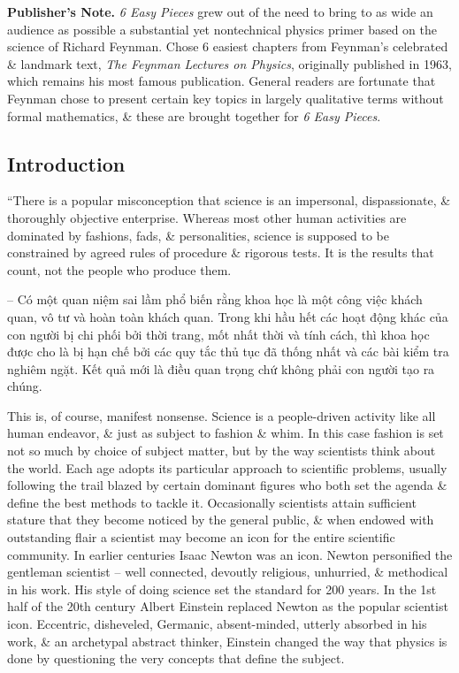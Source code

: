 \documentclass{article}
\begin{document}
{\bf Publisher's Note.} {\it6 Easy Pieces} grew out of the need to bring to as wide an audience as possible a substantial yet nontechnical physics primer based on the science of {\sc Richard Feynman}. Chose 6 easiest chapters from {\sc Feynman}'s celebrated \& landmark text, {\it The Feynman Lectures on Physics}, originally published in 1963, which remains his most famous publication. General readers are fortunate that {\sc Feynman} chose to present certain key topics in largely qualitative terms without formal mathematics, \& these are brought together for {\it6 Easy Pieces}.

\subsection*{Introduction}
``There is a popular misconception that science is an impersonal, dispassionate, \& thoroughly objective enterprise. Whereas most other human activities are dominated by fashions, fads, \& personalities, science is supposed to be constrained by agreed rules of procedure \& rigorous tests. It is the results that count, not the people who produce them.

-- Có một quan niệm sai lầm phổ biến rằng khoa học là một công việc khách quan, vô tư và hoàn toàn khách quan. Trong khi hầu hết các hoạt động khác của con người bị chi phối bởi thời trang, mốt nhất thời và tính cách, thì khoa học được cho là bị hạn chế bởi các quy tắc thủ tục đã thống nhất và các bài kiểm tra nghiêm ngặt. Kết quả mới là điều quan trọng chứ không phải con người tạo ra chúng.

This is, of course, manifest nonsense. Science is a people-driven activity like all human endeavor, \& just as subject to fashion \& whim. In this case fashion is set not so much by choice of subject matter, but by the way scientists think about the world. Each age adopts its particular approach to scientific problems, usually following the trail blazed by certain dominant figures who both set the agenda \& define the best methods to tackle it. Occasionally scientists attain sufficient stature that they become noticed by the general public, \& when endowed with outstanding flair a scientist may become an icon for the entire scientific community. In earlier centuries {\sc Isaac Newton} was an icon. {\sc Newton} personified the gentleman scientist -- well connected, devoutly religious, unhurried, \& methodical in his work. His style of doing science set the standard for 200 years. In the 1st half of the 20th century {\sc Albert Einstein} replaced {\sc Newton} as the popular scientist icon. Eccentric, disheveled, Germanic, absent-minded, utterly absorbed in his work, \& an archetypal abstract thinker, {\sc Einstein} changed the way that physics is done by questioning the very concepts that define the subject.
\end{document}
